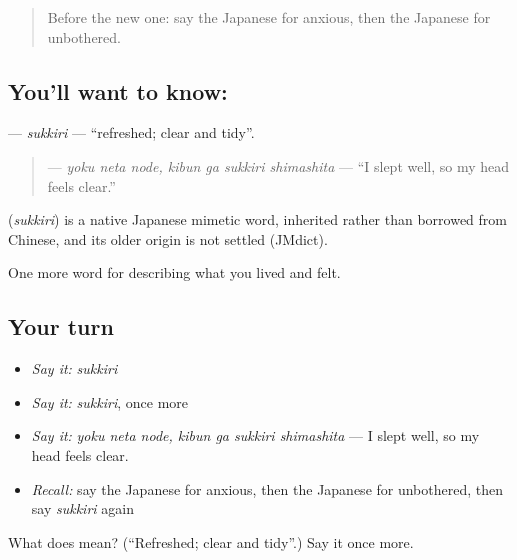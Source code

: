\label{lesson:JA-C426-sukkiri}



\begin{quote}
Before the new one: say the Japanese for anxious, then the Japanese for unbothered.
\end{quote}

\subsection*{You'll want to know: }
\textbf{} — \emph{sukkiri} — \textquotedblleft{}refreshed; clear and tidy\textquotedblright{}.

\begin{quote}
\textbf{  } — \emph{yoku neta node, kibun ga sukkiri shimashita} — \textquotedblleft{}I slept well, so my head feels clear.\textquotedblright{}
\end{quote}

\begin{cousinweb}
\textbf{} (\emph{sukkiri}) is a native Japanese mimetic word, inherited rather than borrowed from Chinese, and its older origin is not settled (JMdict).
\end{cousinweb}

\begin{grammarlens}[title={What you've built}]
One more word for describing what you lived and felt.
\end{grammarlens}

\subsection*{Your turn}
\begin{itemize}
\raggedright
  \item \emph{Say it:} \emph{sukkiri}
  \item \emph{Say it:} \emph{sukkiri}, once more
  \item \emph{Say it:} \emph{yoku neta node, kibun ga sukkiri shimashita} — I slept well, so my head feels clear.
  \item \emph{Recall:} say the Japanese for anxious, then the Japanese for unbothered, then say \emph{sukkiri} again
\end{itemize}

\begin{tcolorbox}[breakable,colback=teal!4,colframe=teal!35!black,title={Before you move on}]
What does  mean? (\textquotedblleft{}Refreshed; clear and tidy\textquotedblright{}.) Say it once more.
\end{tcolorbox}
